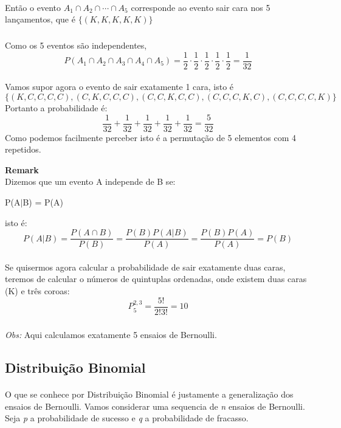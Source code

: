 \documentclass[10pt,a4paper]{article}
\begin{document}
\paragraph{} Então o evento $A_{1} \cap A_{2} \cap \cdots \cap A_{5}$ corresponde ao evento sair cara nos 5 lançamentos, que é $\lbrace(K, K, K, K, K) \rbrace$
\subparagraph{}Como os 5 eventos são independentes, \\
\[P(A_{1} \cap A_{2} \cap A_{3} \cap A_{4} \cap A_{5}) = \frac{1}{2} \cdot \frac{1}{2}\cdot \frac{1}{2} \cdot \frac{1}{2} \cdot \frac{1}{2} = \frac{1}{32}\] 
\paragraph{}Vamos supor agora o evento de sair exatamente 1 cara, isto é
\[\lbrace(K, C, C, C, C), (C, K, C, C, C), (C, C, K, C, C), (C, C, C, K, C), (C, C, C, C, K) \rbrace\]
Portanto a probabilidade é:
\[\frac{1}{32} + \frac{1}{32} + \frac{1}{32} + \frac{1}{32} + \frac{1}{32} = \frac{5}{32}\]
Como podemos facilmente perceber isto é a permutação de 5 elementos com 4 repetidos.
\begin{mdframed}[linewidth=0.6pt]
	\textbf{Remark}\\
	Dizemos que um evento A independe de B se:
	\begin{center}
		P(A$|$B) = P(A)
	\end{center}
	isto é:
	\[P(A|B) = \frac{P(A \cap B)}{P(B)} = \frac{P(B) P(A|B)}{P(A)} = \frac{P(B)P(A)}{P(A)} = 
	P(B)\]
\end{mdframed}

\paragraph{}Se quisermos agora calcular a probabilidade de sair exatamente duas caras, teremos de calcular o números de quintuplas ordenadas, onde existem duas caras (K) e três coroas:
\[P^{2,3}_{5} = \frac{5!}{2!3!} = 10\]
\subparagraph{}\textit{Obs:} Aqui calculamos exatamente 5 ensaios de Bernoulli.

\subsection{Distribuição Binomial}

\paragraph{}O que se conhece por Distribuição Binomial é justamente a generalização dos ensaios de Bernoulli. Vamos considerar uma sequencia de \textit{n} ensaios de Bernoulli. Seja \textit{p} a probabilidade de sucesso e \textit{q} a probabilidade de fracasso.
\end{document}
